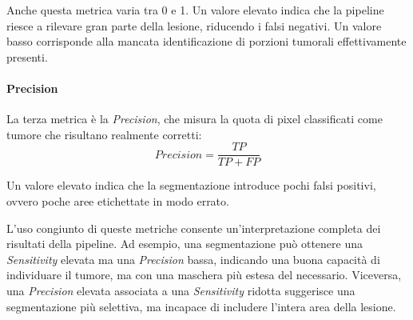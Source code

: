 Anche questa metrica varia tra 0 e 1. Un valore elevato indica che la pipeline riesce a rilevare gran parte della lesione, riducendo i falsi negativi. Un valore basso corrisponde alla mancata identificazione di porzioni tumorali effettivamente presenti.

\paragraph{Precision}
La terza metrica è la \textit{Precision}, che misura la quota di pixel classificati come tumore che risultano realmente corretti:
\[
Precision = \frac{TP}{TP + FP}
\]

Un valore elevato indica che la segmentazione introduce pochi falsi positivi, ovvero poche aree etichettate in modo errato.

L’uso congiunto di queste metriche consente un'interpretazione completa dei risultati della pipeline. Ad esempio, una segmentazione può ottenere una \textit{Sensitivity} elevata ma una \textit{Precision} bassa, indicando una buona capacità di individuare il tumore, ma con una maschera più estesa del necessario.
Viceversa, una \textit{Precision} elevata associata a una \textit{Sensitivity} ridotta suggerisce una segmentazione più selettiva, ma incapace di includere l’intera area della lesione.